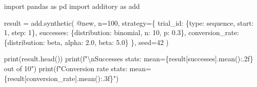 \documentclass[
  letterpaper,
]{scrbook}
\newenvironment{Shaded}{\begin{snugshade}}{\end{snugshade}}
\newcommand{\BuiltInTok}[1]{\textcolor[rgb]{0.00,0.23,0.31}{#1}}
\newcommand{\CharTok}[1]{\textcolor[rgb]{0.13,0.47,0.30}{#1}}
\newcommand{\DecValTok}[1]{\textcolor[rgb]{0.68,0.00,0.00}{#1}}
\newcommand{\FloatTok}[1]{\textcolor[rgb]{0.68,0.00,0.00}{#1}}
\newcommand{\ImportTok}[1]{\textcolor[rgb]{0.00,0.46,0.62}{#1}}
\newcommand{\NormalTok}[1]{\textcolor[rgb]{0.00,0.23,0.31}{#1}}
\newcommand{\OperatorTok}[1]{\textcolor[rgb]{0.37,0.37,0.37}{#1}}
\newcommand{\SpecialCharTok}[1]{\textcolor[rgb]{0.37,0.37,0.37}{#1}}
\newcommand{\SpecialStringTok}[1]{\textcolor[rgb]{0.13,0.47,0.30}{#1}}
\newcommand{\StringTok}[1]{\textcolor[rgb]{0.13,0.47,0.30}{#1}}
\begin{document}
\begin{Shaded}
\begin{Highlighting}[]
\ImportTok{import}\NormalTok{ pandas }\ImportTok{as}\NormalTok{ pd}
\ImportTok{import}\NormalTok{ additory }\ImportTok{as}\NormalTok{ add}

\NormalTok{result }\OperatorTok{=}\NormalTok{ add.synthetic(}
    \StringTok{\textquotesingle{}@new\textquotesingle{}}\NormalTok{,}
\NormalTok{    n}\OperatorTok{=}\DecValTok{100}\NormalTok{,}
\NormalTok{    strategy}\OperatorTok{=}\NormalTok{\{}
        \StringTok{\textquotesingle{}trial\_id\textquotesingle{}}\NormalTok{: \{}\StringTok{\textquotesingle{}type\textquotesingle{}}\NormalTok{: }\StringTok{\textquotesingle{}sequence\textquotesingle{}}\NormalTok{, }\StringTok{\textquotesingle{}start\textquotesingle{}}\NormalTok{: }\DecValTok{1}\NormalTok{, }\StringTok{\textquotesingle{}step\textquotesingle{}}\NormalTok{: }\DecValTok{1}\NormalTok{\},}
        \StringTok{\textquotesingle{}successes\textquotesingle{}}\NormalTok{: \{}\StringTok{\textquotesingle{}distribution\textquotesingle{}}\NormalTok{: }\StringTok{\textquotesingle{}binomial\textquotesingle{}}\NormalTok{, }\StringTok{\textquotesingle{}n\textquotesingle{}}\NormalTok{: }\DecValTok{10}\NormalTok{, }\StringTok{\textquotesingle{}p\textquotesingle{}}\NormalTok{: }\FloatTok{0.3}\NormalTok{\},}
        \StringTok{\textquotesingle{}conversion\_rate\textquotesingle{}}\NormalTok{: \{}\StringTok{\textquotesingle{}distribution\textquotesingle{}}\NormalTok{: }\StringTok{\textquotesingle{}beta\textquotesingle{}}\NormalTok{, }\StringTok{\textquotesingle{}alpha\textquotesingle{}}\NormalTok{: }\FloatTok{2.0}\NormalTok{, }\StringTok{\textquotesingle{}beta\textquotesingle{}}\NormalTok{: }\FloatTok{5.0}\NormalTok{\}}
\NormalTok{    \},}
\NormalTok{    seed}\OperatorTok{=}\DecValTok{42}
\NormalTok{)}

\BuiltInTok{print}\NormalTok{(result.head())}
\BuiltInTok{print}\NormalTok{(}\SpecialStringTok{f"}\CharTok{\textbackslash{}n}\SpecialStringTok{Successes stats: mean=}\SpecialCharTok{\{}\NormalTok{result[}\StringTok{\textquotesingle{}successes\textquotesingle{}}\NormalTok{]}\SpecialCharTok{.}\NormalTok{mean()}\SpecialCharTok{:.2f\}}\SpecialStringTok{ out of 10"}\NormalTok{)}
\BuiltInTok{print}\NormalTok{(}\SpecialStringTok{f"Conversion rate stats: mean=}\SpecialCharTok{\{}\NormalTok{result[}\StringTok{\textquotesingle{}conversion\_rate\textquotesingle{}}\NormalTok{]}\SpecialCharTok{.}\NormalTok{mean()}\SpecialCharTok{:.3f\}}\SpecialStringTok{"}\NormalTok{)}
\end{Highlighting}
\end{Shaded}
\end{document}
